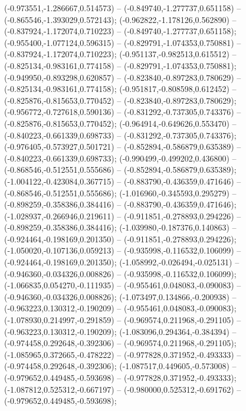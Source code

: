  (-0.973551,-1.286667,0.514573) -- (-0.849740,-1.277737,0.651158) -- (-0.865546,-1.393029,0.572143);
 (-0.962822,-1.178126,0.562890) -- (-0.837924,-1.172074,0.710223) -- (-0.849740,-1.277737,0.651158);
 (-0.955400,-1.077124,0.596315) -- (-0.829791,-1.074353,0.750881) -- (-0.837924,-1.172074,0.710223);
 (-0.951137,-0.982513,0.615512) -- (-0.825134,-0.983161,0.774158) -- (-0.829791,-1.074353,0.750881);
 (-0.949950,-0.893298,0.620857) -- (-0.823840,-0.897283,0.780629) -- (-0.825134,-0.983161,0.774158);
 (-0.951817,-0.808598,0.612452) -- (-0.825876,-0.815653,0.770452) -- (-0.823840,-0.897283,0.780629);
 (-0.956772,-0.727618,0.590136) -- (-0.831292,-0.737305,0.743376) -- (-0.825876,-0.815653,0.770452);
 (-0.964914,-0.649626,0.553470) -- (-0.840223,-0.661339,0.698733) -- (-0.831292,-0.737305,0.743376);
 (-0.976405,-0.573927,0.501721) -- (-0.852894,-0.586879,0.635389) -- (-0.840223,-0.661339,0.698733);
 (-0.990499,-0.499202,0.436800) -- (-0.868546,-0.512551,0.555686) -- (-0.852894,-0.586879,0.635389);
 (-1.004122,-0.423084,0.367715) -- (-0.883790,-0.436359,0.471646) -- (-0.868546,-0.512551,0.555686);
 (-1.016960,-0.345593,0.295279) -- (-0.898259,-0.358386,0.384416) -- (-0.883790,-0.436359,0.471646);
 (-1.028937,-0.266946,0.219611) -- (-0.911851,-0.278893,0.294226) -- (-0.898259,-0.358386,0.384416);
 (-1.039980,-0.187376,0.140863) -- (-0.924464,-0.198169,0.201350) -- (-0.911851,-0.278893,0.294226);
 (-1.050020,-0.107136,0.059213) -- (-0.935998,-0.116532,0.106099) -- (-0.924464,-0.198169,0.201350);
 (-1.058992,-0.026494,-0.025131) -- (-0.946360,-0.034326,0.008826) -- (-0.935998,-0.116532,0.106099);
 (-1.066835,0.054270,-0.111935) -- (-0.955461,0.048083,-0.090083) -- (-0.946360,-0.034326,0.008826);
 (-1.073497,0.134866,-0.200938) -- (-0.963223,0.130312,-0.190209) -- (-0.955461,0.048083,-0.090083);
 (-1.078930,0.214997,-0.291859) -- (-0.969574,0.211968,-0.291105) -- (-0.963223,0.130312,-0.190209);
 (-1.083096,0.294364,-0.384394) -- (-0.974458,0.292648,-0.392306) -- (-0.969574,0.211968,-0.291105);
 (-1.085965,0.372665,-0.478222) -- (-0.977828,0.371952,-0.493333) -- (-0.974458,0.292648,-0.392306);
 (-1.087517,0.449605,-0.573008) -- (-0.979652,0.449485,-0.593698) -- (-0.977828,0.371952,-0.493333);
 (-1.087812,0.525312,-0.667197) -- (-0.980000,0.525312,-0.691762) -- (-0.979652,0.449485,-0.593698);
